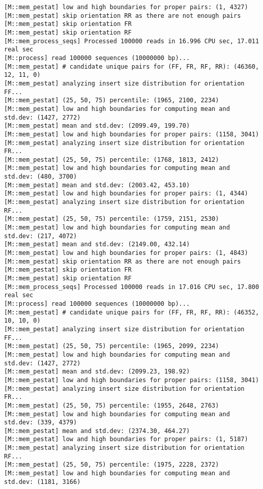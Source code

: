 \begin{lstlisting}
[M::mem_pestat] low and high boundaries for proper pairs: (1, 4327)
[M::mem_pestat] skip orientation RR as there are not enough pairs
[M::mem_pestat] skip orientation FR
[M::mem_pestat] skip orientation RF
[M::mem_process_seqs] Processed 100000 reads in 16.996 CPU sec, 17.011 real sec
[M::process] read 100000 sequences (10000000 bp)...
[M::mem_pestat] # candidate unique pairs for (FF, FR, RF, RR): (46360, 12, 11, 0)
[M::mem_pestat] analyzing insert size distribution for orientation FF...
[M::mem_pestat] (25, 50, 75) percentile: (1965, 2100, 2234)
[M::mem_pestat] low and high boundaries for computing mean and std.dev: (1427, 2772)
[M::mem_pestat] mean and std.dev: (2099.49, 199.70)
[M::mem_pestat] low and high boundaries for proper pairs: (1158, 3041)
[M::mem_pestat] analyzing insert size distribution for orientation FR...
[M::mem_pestat] (25, 50, 75) percentile: (1768, 1813, 2412)
[M::mem_pestat] low and high boundaries for computing mean and std.dev: (480, 3700)
[M::mem_pestat] mean and std.dev: (2003.42, 453.10)
[M::mem_pestat] low and high boundaries for proper pairs: (1, 4344)
[M::mem_pestat] analyzing insert size distribution for orientation RF...
[M::mem_pestat] (25, 50, 75) percentile: (1759, 2151, 2530)
[M::mem_pestat] low and high boundaries for computing mean and std.dev: (217, 4072)
[M::mem_pestat] mean and std.dev: (2149.00, 432.14)
[M::mem_pestat] low and high boundaries for proper pairs: (1, 4843)
[M::mem_pestat] skip orientation RR as there are not enough pairs
[M::mem_pestat] skip orientation FR
[M::mem_pestat] skip orientation RF
[M::mem_process_seqs] Processed 100000 reads in 17.016 CPU sec, 17.800 real sec
[M::process] read 100000 sequences (10000000 bp)...
[M::mem_pestat] # candidate unique pairs for (FF, FR, RF, RR): (46352, 10, 10, 0)
[M::mem_pestat] analyzing insert size distribution for orientation FF...
[M::mem_pestat] (25, 50, 75) percentile: (1965, 2099, 2234)
[M::mem_pestat] low and high boundaries for computing mean and std.dev: (1427, 2772)
[M::mem_pestat] mean and std.dev: (2099.23, 198.92)
[M::mem_pestat] low and high boundaries for proper pairs: (1158, 3041)
[M::mem_pestat] analyzing insert size distribution for orientation FR...
[M::mem_pestat] (25, 50, 75) percentile: (1955, 2648, 2763)
[M::mem_pestat] low and high boundaries for computing mean and std.dev: (339, 4379)
[M::mem_pestat] mean and std.dev: (2374.30, 464.27)
[M::mem_pestat] low and high boundaries for proper pairs: (1, 5187)
[M::mem_pestat] analyzing insert size distribution for orientation RF...
[M::mem_pestat] (25, 50, 75) percentile: (1975, 2228, 2372)
[M::mem_pestat] low and high boundaries for computing mean and std.dev: (1181, 3166)

\end{lstlisting}
